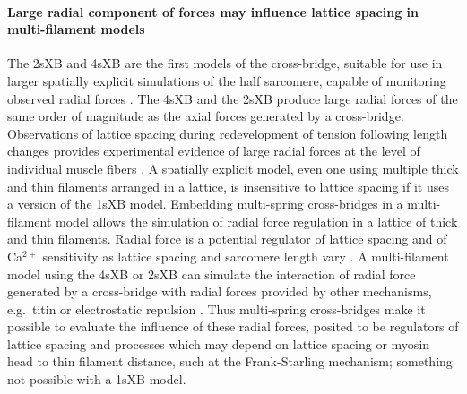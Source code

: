 \documentclass[]{article}
\begin{document}
\paragraph{Large radial component of forces may influence lattice spacing in multi-filament models} %
The 2sXB and 4sXB are the first models of the cross-bridge, suitable for use in larger spatially explicit simulations of the half sarcomere, capable of monitoring observed radial forces \citep{Cecchi1990, Millman1998}. 
The 4sXB and the 2sXB produce large radial forces of the same order of magnitude as the axial forces generated by a cross-bridge. 
Observations of lattice spacing during redevelopment of tension following length changes provides experimental evidence of large radial forces at the level of individual muscle fibers \citep{Cecchi1990}. %
A spatially explicit model, even one using multiple thick and thin filaments arranged in a lattice, is insensitive to lattice spacing if it uses a version of the 1sXB model.  
Embedding multi-spring cross-bridges in a multi-filament model allows the simulation of radial force regulation in a lattice of thick and thin filaments.  
Radial force is a potential regulator of lattice spacing and of Ca$^{2+}$ sensitivity as lattice spacing and sarcomere length vary \citep{Millman1998}.  
A multi-filament model using the 4sXB or 2sXB can simulate the interaction of radial force generated by a cross-bridge with radial forces provided by other mechanisms, e.g.\ titin or electrostatic repulsion \citep{Martyn2004, Cazorla2001, Millman1998}. 
Thus multi-spring cross-bridges make it possible to evaluate the influence of these radial forces, posited to be regulators of lattice spacing and processes which may depend on lattice spacing or myosin head to thin filament distance, such at the Frank-Starling mechanism; something not possible with a 1sXB model. 
\end{document}
